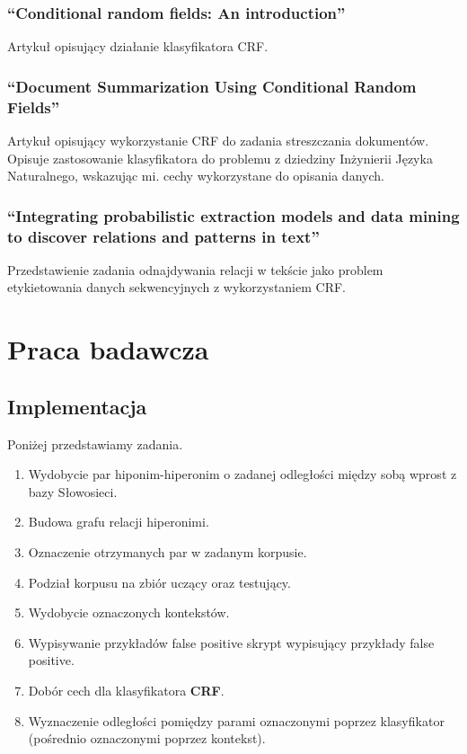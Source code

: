 \documentclass[a4paper,10pt]{report}
\begin{document}
\subsection{``Conditional random fields: An introduction'' \cite{wallach2004crf}}

Artykuł opisujący działanie klasyfikatora CRF.

\subsection{``Document Summarization Using Conditional Random Fields'' \cite{shen2007doccum}}

Artykuł opisujący wykorzystanie CRF do zadania streszczania dokumentów.
Opisuje zastosowanie klasyfikatora do problemu z dziedziny Inżynierii Języka Naturalnego, wskazując mi. cechy wykorzystane do opisania danych.  

\subsection{``Integrating probabilistic extraction models and data mining to discover relations and patterns in text'' \cite{culotta2006integrating}}

Przedstawienie zadania odnajdywania relacji w tekście jako problem etykietowania danych sekwencyjnych z wykorzystaniem CRF.


\chapter{Praca badawcza}

\section{Implementacja}

\noindent Poniżej przedstawiamy zadania.
\begin{enumerate}
 \item Wydobycie par hiponim-hiperonim o zadanej odległości między sobą wprost z bazy Słowosieci. %
 \item Budowa grafu relacji hiperonimi. %
 \item Oznaczenie otrzymanych par w zadanym korpusie. %
 \item Podział korpusu na zbiór uczący oraz testujący. %
 \item Wydobycie oznaczonych kontekstów. %
 \item Wypisywanie przykładów false positive skrypt wypisujący przykłady false positive.
 \item Dobór cech dla klasyfikatora \textbf{CRF}.  %
 \item Wyznaczenie odległości pomiędzy parami oznaczonymi poprzez klasyfikator (pośrednio oznaczonymi poprzez kontekst).  %
\end{enumerate}
\end{document}

